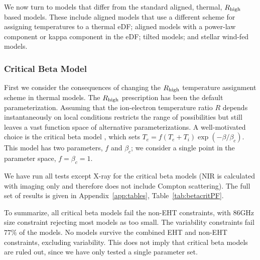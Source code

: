 We now turn to models that differ from the standard aligned, thermal, $R_\mathrm{high}$ based models.  These include aligned models that use a different scheme for assigning temperatures to a thermal eDF; aligned models with a power-law component or kappa component in the eDF; tilted models; and stellar wind-fed models.

\subsubsection{Critical Beta Model}

First we consider the consequences of changing the $R_\mathrm{high}$ temperature assignment scheme in thermal models.  The $R_\mathrm{high}$ prescription has been the default parameterization.  Assuming that the ion-electron temperature ratio $R$ depends instantaneously on local conditions restricts the range of possibilities but still leaves a vast function space of alternative parameterizations.  A well-motivated choice is the critical beta model \citep{2020MNRAS.493.1404A}, which sets $T_e = f (T_e + T_i) \exp(-\beta/\beta_c)$.  This model has two parameters, $f$ and $\beta_c$; we consider a single point in the parameter space, $f = \beta_c = 1$.

We have run all tests except X-ray for the critical beta models (NIR is calculated with imaging only and therefore does not include Compton scattering).  The full set of results is given in Appendix~\ref{app:tables}, Table~\ref{tab:betacritPF}.

To summarize, all critical beta models fail the non-EHT constraints, with 86GHz size constraint rejecting most models as too small.  The variability constraints fail $77\%$ of the models.  No models survive the combined EHT and non-EHT constraints, excluding variability.  This does not imply that critical beta models are ruled out, since we have only tested a single parameter set.


